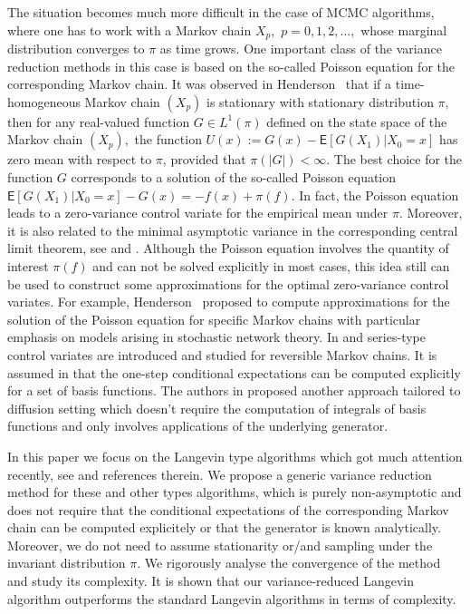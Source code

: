 \documentclass[article]{elsarticle}
\begin{document}
The situation becomes much more difficult in the case of MCMC algorithms, where one  has to work with a
Markov chain \(X_p,\) \(p=0,1,2,\ldots,\) whose marginal distribution  converges  to \(\pi\) as time grows. One important class of the variance reduction methods in this case  is based on the so-called Poisson equation for the corresponding  Markov chain. It was observed in Henderson~\cite{henderson1997variance}  that if a time-homogeneous Markov chain \((X_p)\) is stationary with stationary distribution \(\pi,\) then for any real-valued function \(G \in L^1(\pi) \) defined on the state space of the Markov chain \((X_p),\)  the function \(U(x) := G(x)-\mathsf{E}[G(X_{1})|X_0 = x]\) has zero mean with respect to \(\pi\), provided that \(\pi(|G|) < \infty\).  The best choice for the function \(G\) corresponds to a solution of the so-called Poisson equation  \(\mathsf{E}[G(X_{1})|X_0 = x]-G(x)=-f(x)+\pi(f)\).  In fact,  the Poisson equation leads to a zero-variance control variate for the empirical mean under \(\pi.\) Moreover, it is also related to the minimal asymptotic variance in the corresponding central limit theorem, see \cite{duncan2016variance} and \cite{mira2013zero}.   Although the Poisson equation involves the quantity of interest \(\pi(f)\)  and can not be  solved explicitly in most cases, this idea still can be used to construct some  approximations for the optimal zero-variance control variates. For example,  Henderson~\cite{henderson1997variance} proposed to compute approximations for the solution of the Poisson equation for specific Markov chains with particular emphasis on models arising in stochastic network theory. In \cite{dellaportas2012control} and \cite{brosse2018diffusion}  series-type control variates are introduced and studied for reversible Markov chains. It is assumed in \cite{dellaportas2012control}  that the one-step conditional expectations  can be computed explicitly  for a set of basis functions. The authors in \cite{brosse2018diffusion} proposed another approach tailored to diffusion setting which doesn't require the computation of integrals of basis functions and only involves  applications of the underlying generator.
\par
In this paper we focus on the  Langevin type algorithms which got much attention recently, see \cite{dalalyan2017theoretical,durmus:moulines:2017} and references therein. We propose  a generic variance reduction method for these and other types algorithms, which is purely non-asymptotic and does not require that    the conditional expectations of the corresponding Markov chain can be computed explicitely or that the generator is known analytically. Moreover, we do not need to assume stationarity or/and sampling under the invariant distribution \(\pi.\) We rigorously analyse the convergence of the method and study its complexity. It is shown that  our variance-reduced Langevin algorithm outperforms the standard Langevin algorithms in terms of complexity.
\end{document}
